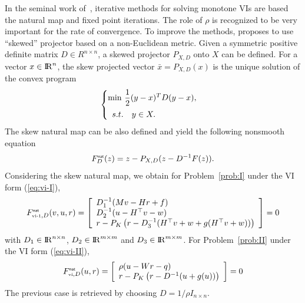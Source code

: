 In the seminal work of~\cite{Sibony1970}, iterative methods for solving monotone VIs are based the natural map and fixed point iterations. The role of $\rho$ is recognized to be very important for the rate of convergence. To improve the methods, \citet{Sibony1970} proposes to use ``skewed'' projector based on a non-Euclidean metric. Given a symmetric positive definite matrix $D\in R^{n\times n}$, a skewed projector $P_{X,D}$ onto $X$ can be defined. For a vector $x\in \mathrm{I\!R}^n$, the skew projected vector $\bar x  = P_{X,D}(x)$ is the unique solution of the convex program
\begin{equation}
  \label{eq:opt-proj-skew}
  \begin{cases}
    \min\, \Frac 1 2 (y-x)^T D (y-x), \\[2mm]
    \begin{array}{ll}
    s.t. & y \in X .
  \end{array}
  \end{cases}
\end{equation} 
The skew natural map can be also defined and yield the following nonsmooth equation
\begin{equation}
  \label{eq:skew-natural-NE}
   F_D^\nat(z) = z - P_{X,D}(z-D^{-1} F(z)).
\end{equation}
Considering the skew natural map, we obtain for Problem~\ref{prob:I} under the VI form (\ref{eq:vi-I}),
\begin{equation}
  \label{eq:natural-typeI}
  F_{\vione,D}^\nat(v,u,r) = \left[
  \begin{array}{l}
    D_1^{-1} (Mv - Hr + f) \\ 
    D_2^{-1} (u-H^\top v -w) \\
    r - P_{K}\left(r  - D_3^{-1} (H^\top v + w  + g(H^\top v + w))\right)
  \end{array}\right] = 0
\end{equation}
with $D_1\in \mathrm{I\!R}^{n\times n}$, $D_2\in \mathrm{I\!R}^{m\times m}$ and $D_3\in \mathrm{I\!R}^{m\times m}$.
For Problem~\ref{prob:II} under the VI form (\ref{eq:vi-II}),
\begin{equation}
  \label{eq:natural-typeII}
  F_{\vitwo,D}^\nat(u,r) = \left[
  \begin{array}{l} 
    \rho(u - W r -q)\\
    r - P_{K}\left(r  - D^{-1} (u   + g(u))\right)  \end{array}\right] = 0
\end{equation}
The previous case is retrieved by choosing $D = 1/ \rho I_{n\times n}$. 





